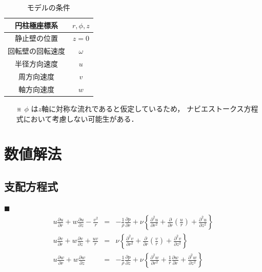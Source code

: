 \documentclass[twocolumn,a4j]{jsarticle}
\begin{document}
\begin{table}[hbtp]
  \label{table:data_type}
  \caption{モデルの条件}
  \centering
  \begin{tabular}{ c | c }
    \hline
    円柱極座標系     & $r, \phi, z$ \\ \hline
    静止壁の位置     & $z = 0$      \\ \hline
    回転壁の回転速度 & $\omega$     \\ \hline
    半径方向速度     & $u$          \\ \hline
    周方向速度       & $v$          \\ \hline
    軸方向速度       & $w$          \\ \hline
  \end{tabular}

  \begin{itemize}
    \item [※] $\phi$ は$z$軸に対称な流れであると仮定しているため，
          ナビエストークス方程式において考慮しない可能生がある．
  \end{itemize}
\end{table}

\section{数値解法}

\subsection*{支配方程式}

$\blacksquare$ 
\begin{eqnarray*}
  u \frac{\partial u}{\partial r} + w \frac{\partial u}{\partial z} - \frac{v^2}{r} &=& -\frac{1}{\rho}\frac{\partial p}{\partial r} + \nu \left\{\frac{\partial^2 u}{\partial r^2} + \frac{\partial}{\partial r}\left(\frac{u}{r}\right) + \frac{\partial^2 u}{\partial z^2}\right\}\\
  u \frac{\partial v}{\partial r} + w \frac{\partial v}{\partial z} + \frac{uv}{r} &=& \nu \left\{\frac{\partial^2 v}{\partial r^2} + \frac{\partial}{\partial r}\left(\frac{v}{r}\right) + \frac{\partial^2 v}{\partial z^2}\right\}\\
  u \frac{\partial w}{\partial r} + w \frac{\partial w}{\partial z} &=& -\frac{1}{\rho}\frac{\partial p}{\partial z} + \nu \left\{\frac{\partial^2 w}{\partial r^2} + \frac{1}{r}\frac{\partial w}{\partial r} + \frac{\partial^2 w}{\partial z^2}\right\}\\
\end{eqnarray*}
\end{document}

